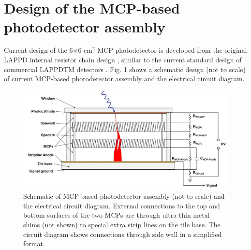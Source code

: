 \documentclass[preprint,5p]{elsarticle}
\begin{document}
\section{Design of the MCP-based photodetector assembly} \label{sec_design}
Current design of the 6$\times$6 cm$^2$ MCP photodetector is developed from the original LAPPD internal resistor chain design \cite{Wang-MCPs2}, similar to the current standard design of commercial LAPPDTM detectors \cite{Craven-MCPs}. Fig. 1 shows a schematic design (not to scale) of current MCP-based photodetector assembly and the electrical circuit diagram. 
\begin{figure}[tbp]
\centering 
\includegraphics[scale=0.21]{fig/MCPs_design.png}
\caption{Schematic of MCP-based photodetector assembly (not to scale) and the electrical circuit diagram. External connections to the top and bottom surfaces of the two MCPs are through ultra-thin metal shims (not shown) to special extra strip lines on the tile base. The circuit diagram shows connections through side wall in a simplified format.} 
\label{fig:design}
\end{figure}
\end{document}
